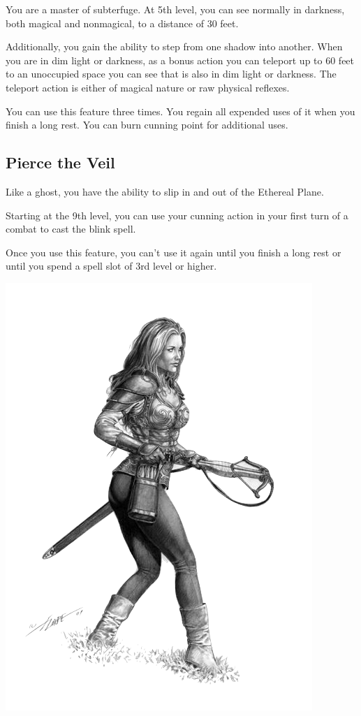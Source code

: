 \begin{multicols*}{2}
You are a master of subterfuge. At 5th level, you can see normally in darkness, both magical and nonmagical, to a distance of 30 feet.

Additionally, you gain the ability to step from one shadow into another. When you are in dim light or darkness, as a bonus action you can teleport up to 60 feet to an unoccupied space you can see that is also in dim light or darkness. The teleport action is either of magical nature or raw physical reflexes. 

You can use this feature three times. You regain all expended uses of it when you finish a long rest. You can burn cunning point for additional uses.

\subsection*{Pierce the Veil}

Like a ghost, you have the ability to slip in and out of the Ethereal Plane.

Starting at the 9th level, you can use your cunning action in your first turn of a combat to cast the blink spell.

Once you use this feature, you can’t use it again until you finish a long rest or until you spend a spell slot of 3rd level or higher.

\begin{Figure}
\centering
\includegraphics[width=\textwidth]{img/female-rogue.png}
\end{Figure}
    
\end{multicols*}
